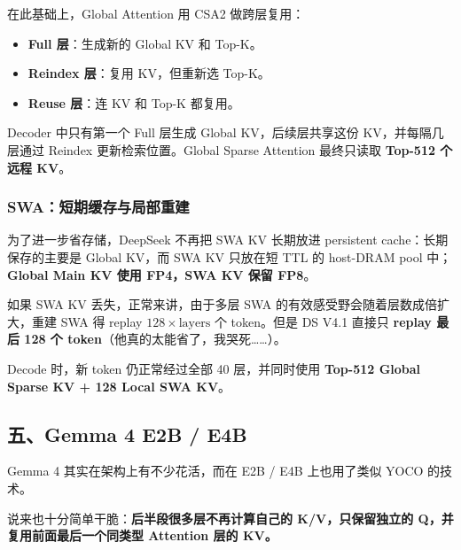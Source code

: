 \documentclass[
  11pt,
  a4paper,
  fontset=none]{ctexart}
\providecommand{\tightlist}{%
  \setlength{\itemsep}{0pt}\setlength{\parskip}{0pt}}
\begin{document}
在此基础上，Global Attention 用 CSA2 做跨层复用：

\begin{itemize}
\tightlist
\item
  \textbf{Full 层}：生成新的 Global KV 和 Top-K。
\item
  \textbf{Reindex 层}：复用 KV，但重新选 Top-K。
\item
  \textbf{Reuse 层}：连 KV 和 Top-K 都复用。
\end{itemize}

Decoder 中只有第一个 Full 层生成 Global KV，后续层共享这份
KV，并每隔几层通过 Reindex 更新检索位置。Global Sparse Attention
最终只读取 \textbf{Top-512 个远程 KV}。

\subsubsection{SWA：短期缓存与局部重建}\label{swaux77edux671fux7f13ux5b58ux4e0eux5c40ux90e8ux91cdux5efa}

为了进一步省存储，DeepSeek 不再把 SWA KV 长期放进 persistent
cache：长期保存的主要是 Global KV，而 SWA KV 只放在短 TTL 的 host-DRAM
pool 中；\textbf{Global Main KV 使用 FP4，SWA KV 保留 FP8}。

如果 SWA KV 丢失，正常来讲，由于多层 SWA
的有效感受野会随着层数成倍扩大，重建 SWA 得 replay
\(128\times\text{layers}\) 个 token。但是 DS V4.1 直接只 \textbf{replay
最后 128 个 token}（他真的太能省了，我哭死\ldots\ldots）。

Decode 时，新 token 仍正常经过全部 40 层，并同时使用 \textbf{Top-512
Global Sparse KV + 128 Local SWA KV}。

\clearpage

\subsection{五、Gemma 4 E2B / E4B}\label{ux4e94gemma-4-e2b-e4b}

Gemma 4 其实在架构上有不少花活，而在 E2B / E4B 上也用了类似 YOCO
的技术。

说来也十分简单干脆：\textbf{后半段很多层不再计算自己的 K/V，只保留独立的
Q，并复用前面最后一个同类型 Attention 层的 KV。}
\end{document}

